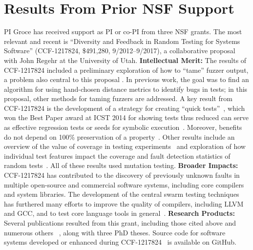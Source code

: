 \section{Results From Prior NSF Support}

PI Groce has received support as PI or co-PI from three NSF grants.
The most relevant and recent is ``Diversity and Feedback in Random
Testing for Systems Software'' (CCF-1217824,
\$491,280, 9/2012--9/2017), a collaborative proposal with John Regehr at the
University of Utah.
{\bf Intellectual Merit:} 
The results of CCF-1217824 included a preliminary exploration of how to
``tame'' fuzzer output, a problem also central to this proposal
\cite{PLDI13}.  In previous work, the goal was to find an algorithm
for using hand-chosen distance metrics to identify bugs in tests; in
this proposal, other methods for taming fuzzers are addressed.
A key result from CCF-1217824
is the development of a strategy for creating ``quick tests''~\cite{icst2014}, which won the
Best Paper award at ICST 2014 for showing tests thus
reduced can serve as effective regression tests or seeds for
symbolic execution~\cite{stvrcausereduce, issta14}.  Moreover, benefits do not depend on 100\%
preservation of a property~\cite{AlipourETAL16TestReduction}.   Other results include an overview of the value of coverage in
testing experiments~\cite{Onward14} and exploration of how individual
test features impact the coverage and fault detection statistics of
random tests~\cite{helphelp}.  
All of these results used
mutation testing. 
{\bf Broader Impacts:} 
CCF-1217824 has contributed to the discovery of previously
unknown faults in multiple open-source and commercial software
systems, including core compilers and system libraries.  The
development of the central swarm testing techniques
has furthered many efforts to improve
the quality of compilers, including LLVM and GCC, and to test core language
tools in
general~\cite{ZhendongPLDI14,beginnerluck,dewey2015fuzzing,le2015randomized}. 
{\bf Research Products:}
Several publications resulted from this grant, including
those cited above and numerous others ~\cite{Onward14,PLDI13,issta14,icst2014,helphelp,DirectedSwarm,stvrcausereduce,tstlsttt,ISSTA15,AlipourETAL16TestReduction,tstlsttt,NFM15},
along with three PhD theses.  Source code for software systems
developed or enhanced during CCF-1217824~\cite{swarmtools,TSTL}  is
available on GitHub.